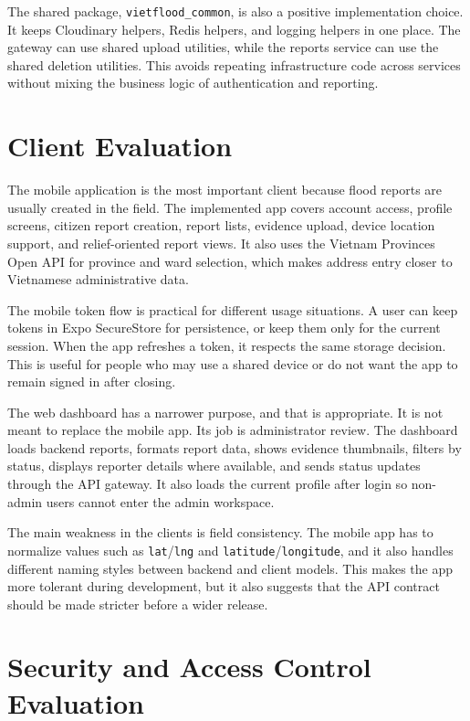 The shared package, \texttt{vietflood\_common}, is also a positive implementation choice. It keeps Cloudinary helpers, Redis helpers, and logging helpers in one place. The gateway can use shared upload utilities, while the reports service can use the shared deletion utilities. This avoids repeating infrastructure code across services without mixing the business logic of authentication and reporting.

\section{Client Evaluation}

The mobile application is the most important client because flood reports are usually created in the field. The implemented app covers account access, profile screens, citizen report creation, report lists, evidence upload, device location support, and relief-oriented report views. It also uses the Vietnam Provinces Open API for province and ward selection, which makes address entry closer to Vietnamese administrative data.

The mobile token flow is practical for different usage situations. A user can keep tokens in Expo SecureStore for persistence, or keep them only for the current session. When the app refreshes a token, it respects the same storage decision. This is useful for people who may use a shared device or do not want the app to remain signed in after closing.

The web dashboard has a narrower purpose, and that is appropriate. It is not meant to replace the mobile app. Its job is administrator review. The dashboard loads backend reports, formats report data, shows evidence thumbnails, filters by status, displays reporter details where available, and sends status updates through the API gateway. It also loads the current profile after login so non-admin users cannot enter the admin workspace.

The main weakness in the clients is field consistency. The mobile app has to normalize values such as \texttt{lat}/\texttt{lng} and \texttt{latitude}/\texttt{longitude}, and it also handles different naming styles between backend and client models. This makes the app more tolerant during development, but it also suggests that the API contract should be made stricter before a wider release.

\section{Security and Access Control Evaluation}

